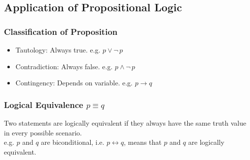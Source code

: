 \documentclass[11pt]{article}
\begin{document}
\subsection{Application of Propositional Logic}
\subsubsection{Classification of Proposition}
\begin{itemize}
    \item Tautology: Always true. e.g. $p\lor \lnot\,p$
    \item Contradiction: Always false. e.g. $p\land \lnot\,p$
    \item Contingency: Depends on variable. e.g. $p\rightarrow q$
\end{itemize}
\subsubsection{Logical Equivalence $p \equiv q$}
Two statements are logically equivalent if they always have the same truth value in every possible scenario.\\
e.g. $p$ and $q$ are biconditional, i.e. $p \leftrightarrow q$, means that $p$ and $q$ are logically equivalent.
\end{document}
